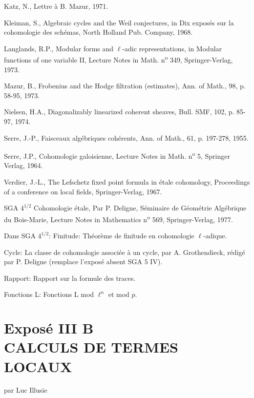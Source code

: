 \begin{enumerate}[label={[\arabic*]},leftmargin=3.5em]
\item Katz, N., Lettre à B. Mazur, 1971.
\item
Kleiman, S., Algebraic cycles and the Weil conjectures, in Dix exposés sur la cohomologie des schémas, North Holland Pub. Company, 1968.
\item Langlands, R.P., Modular forms and $\ell$-adic representations, in Modular functions of one variable II, Lecture Notes in Math. n\textsuperscript{o} 349, Springer-Verlag, 1973.
\item Mazur, B., Frobenius and the Hodge filtration (estimates), Ann. of Math., 98, p. 58-95, 1973.
\item Nielsen, H.A., Diagonalizably linearized coherent sheaves, Bull. SMF, 102, p. 85-97, 1974.
\item Serre, J.-P., Faisceaux algébriques cohérents, Ann. of Math., 61, p. 197-278, 1955.
\item Serre, J.P., Cohomologie galoisienne, Lecture Notes in Math. n\textsuperscript{o} 5, Springer Verlag, 1964.
\item Verdier, J.-L., The Lefschetz fixed point formula in étale cohomology, Proceedings of a conference on local fields, Springer-Verlag, 1967.
\end{enumerate}

SGA $4^{1/2}$ Cohomologie étale, Par P. Deligne, Séminaire de Géométrie Algébrique du Bois-Marie, Lecture Notes in Mathematics n\textsuperscript{o} 569, Springer-Verlag, 1977.

Dans SGA $4^{1/2}$: Finitude: Théorème de finitude en cohomologie $\ell$-adique.

Cycle: La classe de cohomologie associée à un cycle, par A. Grothendieck, rédigé par P. Deligne (remplace l'exposé absent SGA 5 IV).

Rapport: Rapport sur la formule des traces.

Fonctions L: Fonctions L mod $\ell^n$ et mod $p$.

\clearpage
\section*{Exposé III B\\CALCULS DE TERMES LOCAUX}
\begin{center}
par Luc Illusie
\end{center}

